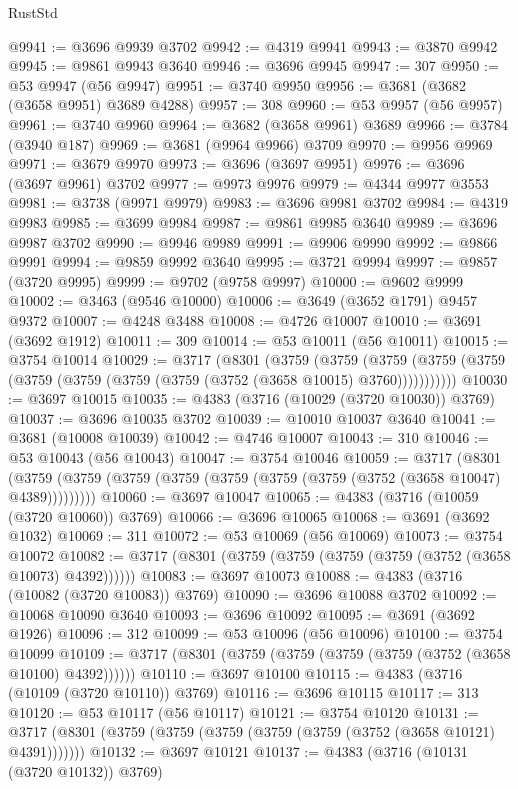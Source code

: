 \begin{lexlean}{RustStd}
\begin{coremodule}
@9941 := @3696 @9939 @3702
@9942 := @4319 @9941
@9943 := @3870 @9942
@9945 := @9861 @9943 @3640
@9946 := @3696 @9945
@9947 := 307
@9950 := @53 @9947 (@56 @9947)
@9951 := @3740 @9950
@9956 := @3681 (@3682 (@3658 @9951) @3689 @4288)
@9957 := 308
@9960 := @53 @9957 (@56 @9957)
@9961 := @3740 @9960
@9964 := @3682 (@3658 @9961) @3689
@9966 := @3784 (@3940 @187)
@9969 := @3681 (@9964 @9966) @3709
@9970 := @9956 @9969
@9971 := @3679 @9970
@9973 := @3696 (@3697 @9951)
@9976 := @3696 (@3697 @9961) @3702
@9977 := @9973 @9976
@9979 := @4344 @9977 @3553
@9981 := @3738 (@9971 @9979)
@9983 := @3696 @9981 @3702
@9984 := @4319 @9983
@9985 := @3699 @9984
@9987 := @9861 @9985 @3640
@9989 := @3696 @9987 @3702
@9990 := @9946 @9989
@9991 := @9906 @9990
@9992 := @9866 @9991
@9994 := @9859 @9992 @3640
@9995 := @3721 @9994
@9997 := @9857 (@3720 @9995)
@9999 := @9702 (@9758 @9997)
@10000 := @9602 @9999
@10002 := @3463 (@9546 @10000)
@10006 := @3649 (@3652 @1791) @9457 @9372
@10007 := @4248 @3488
@10008 := @4726 @10007
@10010 := @3691 (@3692 @1912)
@10011 := 309
@10014 := @53 @10011 (@56 @10011)
@10015 := @3754 @10014
@10029 := @3717
    (@8301
      (@3759
        (@3759
          (@3759 (@3759 (@3759 (@3759 (@3759 (@3759 (@3759 (@3752 (@3658 @10015) @3760)))))))))))
@10030 := @3697 @10015
@10035 := @4383 (@3716 (@10029 (@3720 @10030)) @3769)
@10037 := @3696 @10035 @3702
@10039 := @10010 @10037 @3640
@10041 := @3681 (@10008 @10039)
@10042 := @4746 @10007
@10043 := 310
@10046 := @53 @10043 (@56 @10043)
@10047 := @3754 @10046
@10059 := @3717
    (@8301 (@3759 (@3759 (@3759 (@3759 (@3759 (@3759 (@3759 (@3752 (@3658 @10047) @4389)))))))))
@10060 := @3697 @10047
@10065 := @4383 (@3716 (@10059 (@3720 @10060)) @3769)
@10066 := @3696 @10065
@10068 := @3691 (@3692 @1032)
@10069 := 311
@10072 := @53 @10069 (@56 @10069)
@10073 := @3754 @10072
@10082 := @3717 (@8301 (@3759 (@3759 (@3759 (@3759 (@3752 (@3658 @10073) @4392))))))
@10083 := @3697 @10073
@10088 := @4383 (@3716 (@10082 (@3720 @10083)) @3769)
@10090 := @3696 @10088 @3702
@10092 := @10068 @10090 @3640
@10093 := @3696 @10092
@10095 := @3691 (@3692 @1926)
@10096 := 312
@10099 := @53 @10096 (@56 @10096)
@10100 := @3754 @10099
@10109 := @3717 (@8301 (@3759 (@3759 (@3759 (@3759 (@3752 (@3658 @10100) @4392))))))
@10110 := @3697 @10100
@10115 := @4383 (@3716 (@10109 (@3720 @10110)) @3769)
@10116 := @3696 @10115
@10117 := 313
@10120 := @53 @10117 (@56 @10117)
@10121 := @3754 @10120
@10131 := @3717 (@8301 (@3759 (@3759 (@3759 (@3759 (@3759 (@3752 (@3658 @10121) @4391)))))))
@10132 := @3697 @10121
@10137 := @4383 (@3716 (@10131 (@3720 @10132)) @3769)

\end{coremodule}
\end{lexlean}
